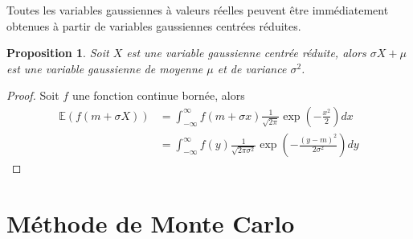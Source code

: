\documentclass[a4paper,12pt]{book}
\newtheorem{propfr}[thmfr]{Proposition}
\begin{document}

Toutes les variables gaussiennes \`a valeurs r\'eelles peuvent \^etre imm\'ediatement obtenues \`a partir de variables gaussiennes centr\'ees r\'eduites.
\begin{propfr}
Soit $X$ est une variable gaussienne centr\'ee r\'eduite, alors $\sigma X + \mu$ est une variable gaussienne de moyenne $\mu$ et de variance $\sigma^2$.
\end{propfr}
\begin{proof}
Soit $f$ une fonction continue bornée, alors
\begin{equation*}
\begin{aligned}
\mathbb{E}(f(m+\sigma X))&=\int_{-\infty}^{\infty} f(m+\sigma x) \frac{1}{\sqrt{2\pi}}\exp\left(-\frac{x^2}{2}\right) dx\\
&=\int_{-\infty}^{\infty} f(y) \frac{1}{\sqrt{2\pi\sigma^2}}\exp\left(-\frac{(y-m)^2}{2\sigma^2}\right) dy
\end{aligned}
\end{equation*}\end{proof}

\section{Méthode de Monte Carlo}
\end{document}
